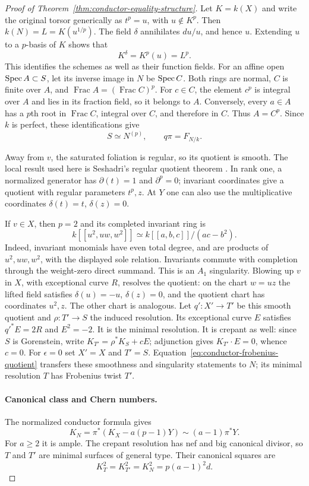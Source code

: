 \begin{proof}[Proof of Theorem~\ref{thm:conductor-equality-structure}]
Let $K=k(X)$ and write the original torsor generically as
$t^p=u$, with $u\notin K^p$. Then $k(N)=L=K(u^{1/p})$.
The field $\delta$ annihilates $du/u$, and hence $u$.
Extending $u$ to a $p$-basis of $K$ shows that
\[
 K^\delta=K^p(u)=L^p.
\]
This identifies the schemes as well as their function fields.
For an affine open $\operatorname{Spec} A\subset S$, let its inverse image in
$N$ be $\operatorname{Spec} C$. Both rings are normal, $C$ is finite over $A$,
and $\operatorname{Frac}A=(\operatorname{Frac}C)^p$.
For $c\in C$, the element $c^p$ is integral over $A$ and lies
in its fraction field, so it belongs to $A$.
Conversely, every $a\in A$ has a $p$th root in
$\operatorname{Frac}C$, integral over $C$, and therefore in $C$.
Thus $A=C^p$. Since $k$ is perfect, these identifications give
\begin{equation}\label{eq:conductor-frobenius-quotient}
 S\simeq N^{(p)},\qquad q\pi=F_{N/k}.
\end{equation}

Away from $v$, the saturated foliation is regular, so its quotient
is smooth. The local result used here is Seshadri's regular
quotient theorem \cite[Proposition~6 and Theorem~2,
pp.~6-11--6-16]{SeshadriCartier}. In rank one, a normalized
generator has $\partial(t)=1$ and $\partial^p=0$; invariant
coordinates give a quotient with regular parameters $t^p,z$.
At $Y$ one can also use the multiplicative coordinates
$\delta(t)=t$, $\delta(z)=0$.

If $v\in X$, then $p=2$ and its completed invariant ring is
\[
 k[[u^2,uw,w^2]]\simeq k[[a,b,c]]/(ac-b^2).
\]
Indeed, invariant monomials have even total degree, and are
products of $u^2,uw,w^2$, with the displayed sole relation.
Invariants commute with completion through the weight-zero
direct summand. This is an $A_1$ singularity. Blowing up $v$
in $X$, with exceptional curve $R$, resolves the quotient:
on the chart $w=uz$ the lifted field satisfies
$\delta(u)=-u$, $\delta(z)=0$, and the quotient chart has
coordinates $u^2,z$. The other chart is analogous.
Let $q':X'\to T'$ be this smooth quotient and $\rho:T'\to S$
the induced resolution. Its exceptional curve $E$ satisfies
$q'^*E=2R$ and $E^2=-2$.
It is the minimal resolution. It is crepant as well: since $S$
is Gorenstein, write $K_{T'}=\rho^*K_S+cE$; adjunction gives
$K_{T'}\cdot E=0$, whence $c=0$.
For $\epsilon=0$ set $X'=X$ and $T'=S$.
Equation~\eqref{eq:conductor-frobenius-quotient} transfers these
smoothness and singularity statements to $N$; its minimal
resolution $T$ has Frobenius twist $T'$.

\paragraph{Canonical class and Chern numbers.}
The normalized conductor formula gives
\[
 K_N=\pi^*(K_X-a(p-1)Y)\sim(a-1)\pi^*Y.
\]
For $a\geq2$ it is ample. The crepant resolution has nef and
big canonical divisor, so $T$ and $T'$ are minimal surfaces of
general type. Their canonical squares are
\[
 K_T^2=K_{T'}^2=K_N^2=p(a-1)^2d.
\]


\end{proof}
